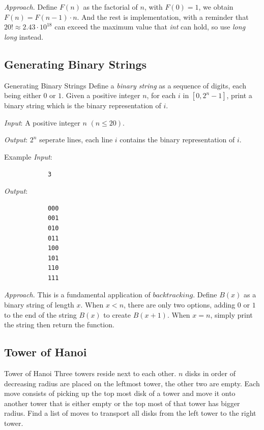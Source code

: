 \documentclass{article}
\begin{document}
    \emph{Approach.} Define $F(n)$ as the factorial of $n$, with $F(0) = 1$, we obtain $F(n) = F(n - 1) \cdot n$. And the rest is implementation, with a reminder that $20! \approx 2.43 \cdot 10^{18}$ can exceed the maximum value that \emph{int} can hold, so use \emph{long long} instead.

    \subsection{Generating Binary Strings}

    \begin{statement*}{Generating Binary Strings}{}
        Define a \emph{binary string} as a sequence of digits, each being either $0$ or $1$. Given a positive integer $n$, for each $i$ in $[0, 2^n - 1]$, print a binary string which is the binary representation of $i$.

        \emph{Input}: A positive integer $n$ $(n \le 20)$.

        \emph{Output}: $2^n$ seperate lines, each line $i$ contains the binary representation of $i$.
        
    \end{statement*}

    \begin{example*}{Example}{}
        \emph{Input}:

        \begin{verbatim}
            3
        \end{verbatim}

        \emph{Output}:

        \begin{verbatim}
            000
            001
            010
            011
            100
            101
            110
            111
        \end{verbatim}
    \end{example*}

    \emph{Approach.} This is a fundamental application of $backtracking$. Define $B(x)$ as a binary string of length $x$. When $x < n$, there are only two options, adding $0$ or $1$ to the end of the string $B(x)$ to create $B(x + 1)$. When $x = n$, simply print the string then return the function.

    \subsection{Tower of Hanoi}

    \begin{statement*}{Tower of Hanoi}{}
        Three towers reside next to each other. $n$ disks in order of decreasing radius are placed on the leftmost tower, the other two are empty. Each move consists of picking up the top most disk of a tower and move it onto another tower that is either empty or the top most of that tower has bigger radius. Find a list of moves to transport all disks from the left tower to the right tower.
    \end{statement*}
\end{document}
